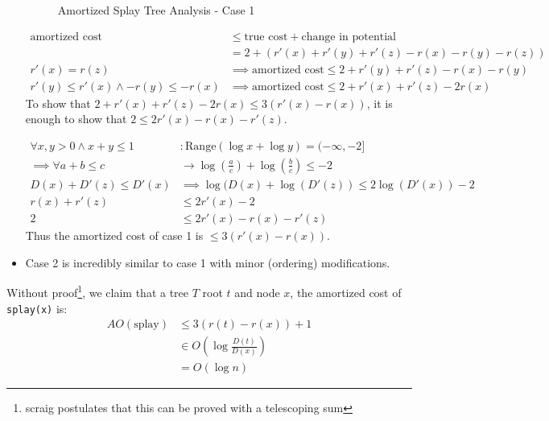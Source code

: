 \begin{itemize}
\begin{figure}[h]
                            \caption{Amortized Splay Tree Analysis - Case 1}
                            \label{fig:splay_trees_amortized_case_1}
                        \end{figure}
                        \begin{align*}
                            \text{amortized cost} &\le \text{true cost} + \text{change in potential} \\
                            &= 2 + (r'(x) + r'(y) + r'(z) - r(x) - r(y) - r(z)) \\
                            r'(x) = r(z) &\implies \text{amortized cost} \le 2 + r'(y) + r'(z) - r(x) - r(y) \\
                            r'(y) \le r'(x) \land -r(y) \le -r(x) &\implies \text{amortized cost} \le 2 + r'(x) + r'(z) - 2r(x)
                        \end{align*}
                        To show that $2 + r'(x) + r'(z) - 2r(x) \le 3(r'(x) - r(x))$, it is enough to show that $2 \le 2r'(x) - r(x) - r'(z)$.

                        \begin{align*}
                            \forall x, y > 0 \land x+y \le 1 &: \text{Range}(\log x + \log y) = (-\infty, -2] \\
                            \implies \forall a + b \le c &\to \log{\left(\frac{a}{c}\right)} + \log{\left(\frac{b}{c}\right)} \le -2 \\
                            D(x) + D'(z) \le D'(x) &\implies \log(D(x)+ \log(D'(z)) \le 2 \log(D'(x)) - 2 \\
                            r(x) + r'(z) &\le 2r'(x) - 2 \\
                            2 &\le 2r'(x) - r(x) - r'(z)
                        \end{align*}
                        Thus the amortized cost of case 1 is $\le 3(r'(x) - r(x))$.
                    \item Case 2 is incredibly similar to case 1 with minor (ordering) modifications.
                \end{itemize}
                Without proof\footnote{scraig postulates that this can be proved with a telescoping sum}, we claim that a tree $T$ root $t$ and node $x$, the amortized cost of \verb|splay(x)| is:
                \begin{align*}
                    A O(\text{splay}) &\le 3(r(t) - r(x)) + 1 \\
                    &\in O(\log{\frac{D(t)}{D(x)}}) \\
                    &= O(\log n)
                \end{align*}

